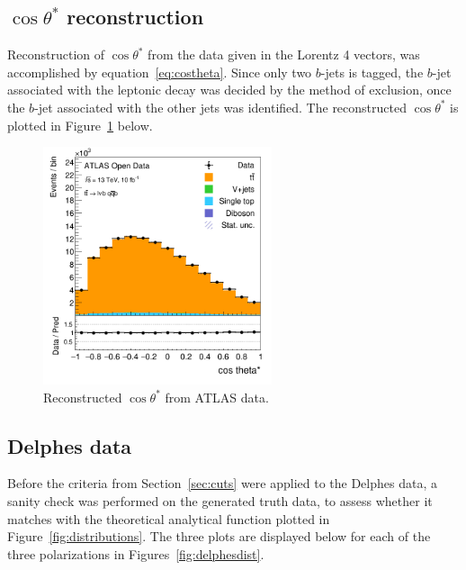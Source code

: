 \documentclass[12pt,a4paper]{article}
\numberwithin{equation}{section}
\begin{document}
\subsection{$\cos \theta^{*}$ reconstruction}
Reconstruction of $\cos \theta^{*}$ from the data given in the Lorentz 4 vectors, was
accomplished by equation~\eqref{eq:costheta}. Since only two $b$-jets is tagged,
the $b$-jet associated with the leptonic decay was decided by the method of
exclusion, once the $b$-jet associated with the other jets was identified. The
reconstructed $\cos \theta^{*}$ is plotted in Figure~\ref{fig:costhetaatlas} below.
\begin{figure}[H]
  \centering
  \includegraphics[width=0.6\textwidth]{figures/hist_costheta}
  \caption{\label{fig:costhetaatlas}Reconstructed $\cos \theta^{*}$ from ATLAS data.}
\end{figure}



\subsection{Delphes data}
Before the criteria from Section~\ref{sec:cuts} were applied to the Delphes
data, a sanity check was performed on the generated truth data, to assess
whether it matches with the theoretical analytical function plotted in
Figure~\ref{fig:distributions}. The three plots are displayed below for each of
the three polarizations in Figures~\ref{fig:delphesdist}.\\
\end{document}
